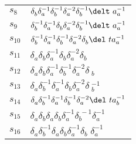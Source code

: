 \documentclass{article}
\begin{document}
\begin{center}
\begin{tabular}{ll}
$s_{8}$ & $\delta_b^{}\delta_a^{-1}\delta_b^{-1}\delta_a^{-2}\delta_b^{-1}\delt\
a_a^{-1}$ \\
$s_{9}$ & $\delta_b^{-1}\delta_a^{-1}\delta_b^{}\delta_a^{-2}\delta_b^{-1}\delt\
a_a^{-1}$ \\
$s_{10}$ & $\delta_b^{-1}\delta_a^{-1}\delta_b^{-1}\delta_a^{-2}\delta_b^{}\del\
ta_a^{-1}$ \\
$s_{11}$ & $\delta_a^{}\delta_b^{}\delta_a^{-1}\delta_b^{}\delta_a^{-2}\delta_b\
^{}$ \\
$s_{12}$ & $\delta_a^{}\delta_b^{}\delta_a^{-1}\delta_b^{-1}\delta_a^{-2}\delta\
_b^{}$ \\
$s_{13}$ & $\delta_a^{}\delta_b^{-1}\delta_a^{-1}\delta_b^{}\delta_a^{-2}\delta\
_b^{-1}$ \\
$s_{14}$ & $\delta_a^{}\delta_b^{-1}\delta_a^{-1}\delta_b^{-1}\delta_a^{-2}\del\
ta_b^{-1}$ \\
$s_{15}$ & $\delta_a^{}\delta_b^{}\delta_a^{}\delta_b^{}\delta_a^{-1}\delta_b^{\
-1}\delta_a^{-1}$ \\
$s_{16}$ & $\delta_a^{}\delta_b^{-1}\delta_a^{}\delta_b^{}\delta_a^{-1}\delta_b\
^{}\delta_a^{-1}$ \\
\bottomrule
\end{tabular}
\end{center}

\thispagestyle{empty}
\end{document}
